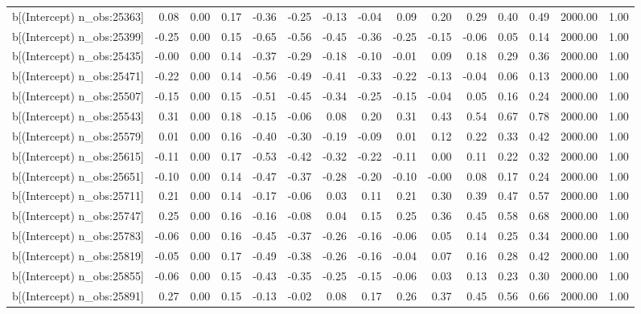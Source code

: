 \begin{table}[ht]
\begin{tabular}{rrrrrrrrrrrrrrr}
  b[(Intercept) n\_obs:25363] & 0.08 & 0.00 & 0.17 & -0.36 & -0.25 & -0.13 & -0.04 & 0.09 & 0.20 & 0.29 & 0.40 & 0.49 & 2000.00 & 1.00 \\ 
  b[(Intercept) n\_obs:25399] & -0.25 & 0.00 & 0.15 & -0.65 & -0.56 & -0.45 & -0.36 & -0.25 & -0.15 & -0.06 & 0.05 & 0.14 & 2000.00 & 1.00 \\ 
  b[(Intercept) n\_obs:25435] & -0.00 & 0.00 & 0.14 & -0.37 & -0.29 & -0.18 & -0.10 & -0.01 & 0.09 & 0.18 & 0.29 & 0.36 & 2000.00 & 1.00 \\ 
  b[(Intercept) n\_obs:25471] & -0.22 & 0.00 & 0.14 & -0.56 & -0.49 & -0.41 & -0.33 & -0.22 & -0.13 & -0.04 & 0.06 & 0.13 & 2000.00 & 1.00 \\ 
  b[(Intercept) n\_obs:25507] & -0.15 & 0.00 & 0.15 & -0.51 & -0.45 & -0.34 & -0.25 & -0.15 & -0.04 & 0.05 & 0.16 & 0.24 & 2000.00 & 1.00 \\ 
  b[(Intercept) n\_obs:25543] & 0.31 & 0.00 & 0.18 & -0.15 & -0.06 & 0.08 & 0.20 & 0.31 & 0.43 & 0.54 & 0.67 & 0.78 & 2000.00 & 1.00 \\ 
  b[(Intercept) n\_obs:25579] & 0.01 & 0.00 & 0.16 & -0.40 & -0.30 & -0.19 & -0.09 & 0.01 & 0.12 & 0.22 & 0.33 & 0.42 & 2000.00 & 1.00 \\ 
  b[(Intercept) n\_obs:25615] & -0.11 & 0.00 & 0.17 & -0.53 & -0.42 & -0.32 & -0.22 & -0.11 & 0.00 & 0.11 & 0.22 & 0.32 & 2000.00 & 1.00 \\ 
  b[(Intercept) n\_obs:25651] & -0.10 & 0.00 & 0.14 & -0.47 & -0.37 & -0.28 & -0.20 & -0.10 & -0.00 & 0.08 & 0.17 & 0.24 & 2000.00 & 1.00 \\ 
  b[(Intercept) n\_obs:25711] & 0.21 & 0.00 & 0.14 & -0.17 & -0.06 & 0.03 & 0.11 & 0.21 & 0.30 & 0.39 & 0.47 & 0.57 & 2000.00 & 1.00 \\ 
  b[(Intercept) n\_obs:25747] & 0.25 & 0.00 & 0.16 & -0.16 & -0.08 & 0.04 & 0.15 & 0.25 & 0.36 & 0.45 & 0.58 & 0.68 & 2000.00 & 1.00 \\ 
  b[(Intercept) n\_obs:25783] & -0.06 & 0.00 & 0.16 & -0.45 & -0.37 & -0.26 & -0.16 & -0.06 & 0.05 & 0.14 & 0.25 & 0.34 & 2000.00 & 1.00 \\ 
  b[(Intercept) n\_obs:25819] & -0.05 & 0.00 & 0.17 & -0.49 & -0.38 & -0.26 & -0.16 & -0.04 & 0.07 & 0.16 & 0.28 & 0.42 & 2000.00 & 1.00 \\ 
  b[(Intercept) n\_obs:25855] & -0.06 & 0.00 & 0.15 & -0.43 & -0.35 & -0.25 & -0.15 & -0.06 & 0.03 & 0.13 & 0.23 & 0.30 & 2000.00 & 1.00 \\ 
  b[(Intercept) n\_obs:25891] & 0.27 & 0.00 & 0.15 & -0.13 & -0.02 & 0.08 & 0.17 & 0.26 & 0.37 & 0.45 & 0.56 & 0.66 & 2000.00 & 1.00 \\ 

\end{tabular}
\end{table}

